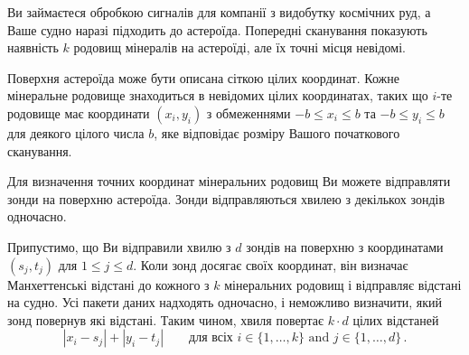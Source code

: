 

\noindent
Ви займаєтеся обробкою сигналів для компанії з видобутку космічних руд, а Ваше судно наразі підходить до астероїда.
Попередні сканування показують наявність $k$ родовищ мінералів на астероїді, але їх точні місця невідомі.

\medskip

Поверхня астероїда може бути описана сіткою цілих координат.
Кожне мінеральне родовище знаходиться в невідомих цілих координатах, таких що $i$-те родовище має координати $(x_i, y_i)$ з обмеженнями
$-b \le x_i \le b$ та $-b\le y_i \le b$ %
для деякого цілого числа $b$, яке відповідає розміру Вашого початкового сканування.

Для визначення точних координат мінеральних родовищ Ви можете відправляти зонди на поверхню астероїда.
Зонди відправляються хвилею з декількох зондів одночасно.

Припустимо, що Ви відправили хвилю з $d$ зондів на поверхню з координатами $(s_j,t_j)$ для $1\leq j\leq d$.
Коли зонд досягає своїх координат, він визначає Манхеттенські відстані до кожного з $k$ мінеральних родовищ і відправляє відстані на судно.
Усі пакети даних надходять одночасно, і неможливо визначити, який зонд повернув які відстані.
Таким чином, хвиля повертає $k\cdot d$ цілих відстаней
\[|x_i-s_j| + |y_i - t_j| \qquad\text{для всіх } i \in \{1,\ldots,k\} \text{ and } j \in\{ 1,\ldots,d\}\,.\]

